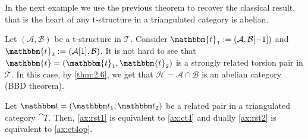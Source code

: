 In the next example we use the previous theorem to recover the classical result, that is the heart of any t-structure in a triangulated category is abelian.

\begin{example}
  Let $(\mathcal{A},\mathcal{B})$ be a t-structure in $\mathcal{T}$. Consider
  $\mathbbm{t}_1:=(\mathcal{A},\mathcal{B}[-1])$ and $\mathbbm{t}_2 :=(\mathcal{A}[1],\mathcal{B})$.
  It is not hard to see that $\mathbbm{t}=(\mathbbm{t}_1,\mathbbm{t}_2)$ is a strongly related
  torsion pair in $\mathcal{T}$. In this case, by \ref{thm:2.6}, we get that $\mathcal{H}=\mathcal{A}\cap\mathcal{B}$
  is an abelian category (BBD theorem).
\end{example}

\begin{lemma}\label{lemma_rst_equiv}
  Let $\t=(\t_1,\t_2)$ be a related pair in a triangulated category $\cat{T}$. Then, \ref{ax:rst1} is equivalent to \ref{ax:ct4} and dually \ref{ax:rst2} is equivalent to \ref{ax:ct4op}.
\end{lemma}
